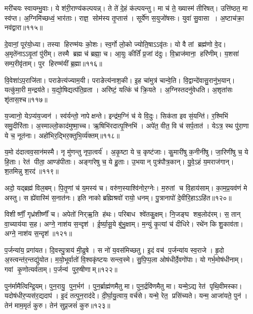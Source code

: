 मरी॑चयः स्वायम्भु॒वाः। ये श॑री॒राण्य॑कल्पयन्न्‌। 
ते ते॑ दे॒हं क॑ल्पयन्तु। मा च॑ ते॒ ख्यास्म॑ तीरिषत्‌। 
उत्ति॑ष्ठत॒ मा स्व॑प्त। अ॒ग्निमि॑च्छध्वं॒ भार॑ताः। 
राज्ञ॒ सोम॑स्य तृ॒प्तास॑। सूर्ये॑ण स॒युजो॑षसः। 
युवा॑ सु॒वासा। अ॒ष्टाच॑क्रा॒ नव॑द्वारा॥११५॥


दे॒वानां॒ पूर॑यो॒ध्या। तस्या हिरण्म॑यः को॒शः। 
स्व॒र्गो लो॒को ज्योति॒षाऽऽवृ॑तः। यो वै तां ब्रह्म॑णो वे॒द। 
अ॒मृते॑नाऽऽवृ॒तां पु॑रीम्‌। तस्मै ब्रह्म च॑ ब्रह्मा॒ च। 
आ॒युः कीर्तिं॑ प्र॒जां द॑दुः। वि॒भ्राज॑माना॒ हरि॑णीम्‌। 
य॒शसा॑ सम्प॒रीवृ॑ताम्‌। पुर हिरण्म॑यीं ब्र॒ह्मा॥११६॥


वि॒वेशा॑ऽप॒राजि॑ता। पराङेत्य॑ज्याम॒यी। 
पराङेत्य॑नाश॒की। इ॒ह चा॑मुत्र॑ चान्वे॒ति। 
वि॒द्वान्दे॑वासु॒रानु॑भ॒यान्‌। यत्कु॑मा॒री म॒न्द्रय॑ते। 
य॒द्यो॒षिद्यत्प॑ति॒व्रता। अरि॑ष्टं॒ यत्किं च॑ क्रि॒यते। 
अ॒ग्निस्तदनु॑वेधति। अ॒शृता॑सः शृ॑तास॒श्च॥११७॥


य॒ज्वानो॒ येऽप्य॑य॒ज्वन॑। स्व॑र्यन्तो॒ नापेक्षन्ते। 
इन्द्र॑म॒ग्निं च॑ ये वि॒दुः। सिक॑ता इव सं॒यन्ति॑। 
र॒श्मिभि॑ समु॒दीरि॑ताः। अ॒स्माल्लो॒काद॑मुष्मा॒च्च। 
ऋ॒षिभि॑रदात्पृ॒श्निभि॑। 
अपे॑त॒ वीत॒ वि च॑ सर्प॒तात॑। येऽत्र॒ स्थ पु॑रा॒णा ये च॒ नूत॑नाः। 
अहो॑भिर॒द्भिर॒क्तु\-भि॒र्व्य॑क्तम्‌॥११८॥


य॒मो द॑दात्वव॒सान॑मस्मै। नृ मु॑णन्तु नृपा॒त्वर्य॑। 
अ॒कृ॒ष्टा ये च॒ कृष्ट॑जाः। कु॒मारी॑षु क॒नीनी॑षु। 
जा॒रिणी॑षु च॒ ये हि॒ताः। रेत॑ पीता॒ आण्ड॑पीताः। 
अङ्गा॑रेषु च॒ ये हु॒ताः। उ॒भयान्‌ पुत्र॑पौत्र॒कान्‌। 
यु॒वे॒ऽहं य॒मराज॑गान्‌। श॒तमिन्नु श॒रद॑॥११९॥


अदो॒ यद्ब्रह्म॑ विल॒बम्‌। पि॒तृ॒णां च॑ य॒मस्य॑ च। 
वरु॑ण॒स्याश्वि॑नोर॒ग्नेः। म॒रुतां च वि॒हाय॑साम्‌। 
का॒म॒प्र॒यव॑णं मे अस्तु। स ह्ये॑वास्मि॑ स॒नात॑नः। 
इति नाको ब्रह्मिश्रवो॑ रायो॒ धनम्‌। पु॒त्रानापो॑ दे॒वीरि॒हाऽऽहि॑त॥१२०॥\anuvakamend


विशीर्ष्णीं॒ गृध्र॑शीर्ष्णीं च। अपेतो॑ निर्‌ऋ॒ति ह॑थः। 
परिबाध श्वे॑तकु॒क्षम्‌। नि॒जङ्घ शब॒लोद॑रम्‌। 
स॒ तान्‌ वा॒च्याय॑या स॒ह। अग्ने॒ नाश॑य स॒न्दृश॑। 
ई॒र्ष्या॒सू॒ये बु॑भु॒क्षाम्‌। म॒न्युं कृ॒त्यां च॑ दीधिरे। 
रथे॑न किशु॒काव॑ता। अग्ने॒ नाश॑य स॒न्दृश॑॥१२१॥\anuvakamend


प॒र्जन्या॑य॒ प्रगा॑यत। दि॒वस्पु॒त्राय॑ मी॒ढुषे। 
स नो॑ य॒वस॑मिच्छतु। इ॒दं वच॑ प॒र्जन्या॑य स्व॒राजे। 
हृ॒दो अ॒स्त्वन्त॑र॒न्तद्यु॑योत। म॒यो॒भूर्वातो॑ वि॒श्वकृ॑ष्टयः सन्त्व॒स्मे। 
सु॒पि॒प्प॒ला ओष॑धीर्दे॒वगो॑पाः। यो गर्भ॒मोष॑धीनाम्‌। 
गवां कृ॒णोत्यर्व॑ताम्‌। प॒र्जन्य॑ पुरु॒षीणाम्‌॥१२२॥\anuvakamend


पुन॑र्मामैत्विन्द्रि॒यम्‌। पुन॒रायु॒ पुन॒र्भग॑। 
पुन॒र्ब्राह्म॑णमैतु मा। पुन॒र्द्रवि॑णमैतु मा। 
यन्मे॒ऽद्य रेत॑ पृथि॒वीमस्का\sn{}। यदोष॑धीर॒प्यस॑र॒द्यदाप॑। 
इ॒दं तत्पुन॒राद॑दे। दी॒र्घा॒यु॒त्वाय॒ वर्च॑से। 
यन्मे॒ रेत॒ प्रसि॑च्यते। यन्म॒ आजा॑यते॒ पुन॑। 
तेन॑ माम॒मृतं॑ कुरु। तेन॑ सुप्र॒जसं॑ कुरु॥१२३॥\anuvakamend


